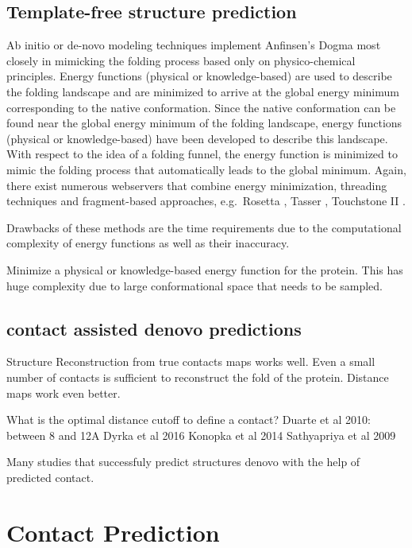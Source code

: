 \documentclass[12pt,a4paper,twoside]{book}
\begin{document}
\subsection{Template-free structure
prediction}\label{template-free-structure-prediction}

Ab initio or de-novo modeling techniques implement Anfinsen's Dogma most
closely in mimicking the folding process based only on physico-chemical
principles. Energy functions (physical or knowledge-based) are used to
describe the folding landscape and are minimized to arrive at the global
energy minimum corresponding to the native conformation. Since the
native conformation can be found near the global energy minimum of the
folding landscape, energy functions (physical or knowledge-based) have
been developed to describe this landscape. With respect to the idea of a
folding funnel, the energy function is minimized to mimic the folding
process that automatically leads to the global minimum. Again, there
exist numerous webservers that combine energy minimization, threading
techniques and fragment-based approaches, e.g.~Rosetta
\citep{Simons1999}, Tasser \citep{Zhang2004}, Touchstone II
\citep{Zhang2003}.

Drawbacks of these methods are the time requirements due to the
computational complexity of energy functions as well as their
inaccuracy.

Minimize a physical or knowledge-based energy function for the protein.
This has huge complexity due to large conformational space that needs to
be sampled.

\subsection{contact assisted denovo
predictions}\label{contact-assisted-denovo-predictions}

Structure Reconstruction from true contacts maps works well. Even a
small number of contacts is sufficient to reconstruct the fold of the
protein. Distance maps work even better.

What is the optimal distance cutoff to define a contact? Duarte et al
2010: between 8 and 12A Dyrka et al 2016 Konopka et al 2014 Sathyapriya
et al 2009

Many studies that successfuly predict structures denovo with the help of
predicted contact.

\section{Contact Prediction}\label{contact-prediction}
\end{document}
